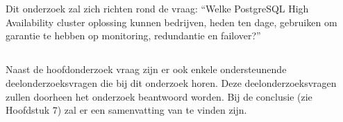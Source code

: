 
\section{}
\label{sec:onderzoeksvraag}

\subsection{}
\label{subsec:Hoofdonderzoeksvraag}

Dit onderzoek zal zich richten rond de vraag: “Welke PostgreSQL High Availability cluster oplossing kunnen bedrijven, heden ten dage, gebruiken om garantie te hebben op monitoring, redundantie en failover?”

\subsection{}
\label{subsec:Deelonderzoeksvraag}

Naast de hoofdonderzoek vraag zijn er ook enkele ondersteunende deelonderzoeksvragen die bij dit onderzoek horen. Deze deelonderzoeksvragen zullen doorheen het onderzoek beantwoord worden. Bij de conclusie (zie Hoofdstuk 7) zal er een samenvatting van te vinden zijn.

